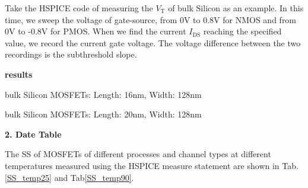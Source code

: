 \documentclass[UTF8,12pt,a4paper]{article}
\begin{document}
Take the HSPICE code of measuring the $V_{\text{T}}$ of bulk Silicon as an example. In this time, we sweep the voltage of gate-source, from 0V to 0.8V for NMOS and from 0V to -0.8V for PMOS. When we find the current $I_{\text{DS}}$ reaching the specified value, we record the current gate voltage. The voltage difference between the two recordings is the subthreshold slope.

\textbf{results}

bulk Silicon MOSFETs: Length: 16nm, Width: 128nm

bulk Silicon MOSFETs: Length: 20nm, Width: 128nm

\textbf{2. Date Table} 

The SS of MOSFETs of different processes and channel types at different temperatures measured using the HSPICE measure statement are shown in Tab.\ref{SS_temp25} and Tab\ref{SS_temp90}.
\setlength{\arrayrulewidth}{0.9pt} %
\begin{table}[h]
    \centering
    \caption{SS for four transistors at temp = $25^\circ$C}
    \label{SS_temp25}
\end{table}
\end{document}
